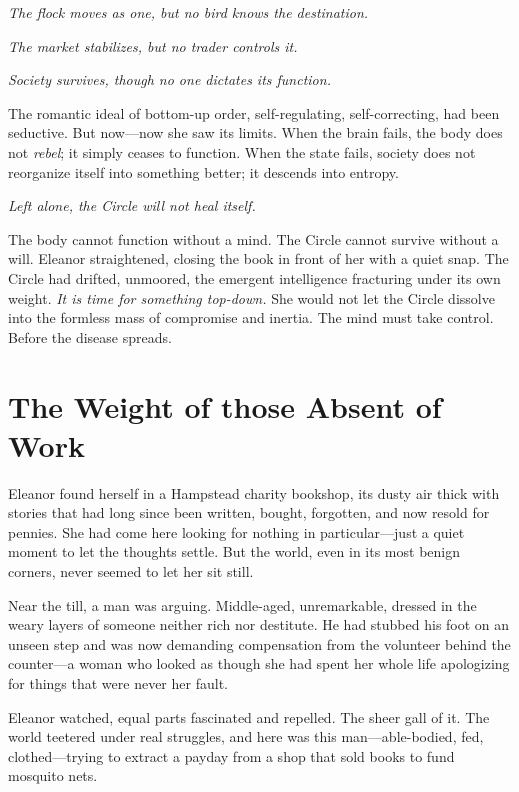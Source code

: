 \smallskip

\textit{The flock moves as one, but no bird knows the destination.}

\textit{The market stabilizes, but no trader controls it.}  

\textit{Society survives, though no one dictates its function.}  

\smallskip

The romantic ideal of bottom-up order, self-regulating, self-correcting, had been seductive. But now—now she saw its limits. When the brain fails, the body does not \textit{rebel}; it simply ceases to function.  When the state fails, society does not reorganize itself into something better; it descends into entropy.  

\smallskip

\textit{Left alone, the Circle will not heal itself.}  

\smallskip

The body cannot function without a mind. The Circle cannot survive without a will. Eleanor straightened, closing the book in front of her with a quiet snap.  The Circle had drifted, unmoored, the emergent intelligence fracturing under its own weight.  \textit{It is time for something top-down.}  She would not let the Circle dissolve into the formless mass of compromise and inertia.  The mind must take control.  Before the disease spreads.  

\newpage
\section*{The Weight of those Absent of Work}

Eleanor found herself in a Hampstead charity bookshop, its dusty air thick with stories that had long since been written, bought, forgotten, and now resold for pennies. She had come here looking for nothing in particular—just a quiet moment to let the thoughts settle. But the world, even in its most benign corners, never seemed to let her sit still.

Near the till, a man was arguing. Middle-aged, unremarkable, dressed in the weary layers of someone neither rich nor destitute. He had stubbed his foot on an unseen step and was now demanding compensation from the volunteer behind the counter—a woman who looked as though she had spent her whole life apologizing for things that were never her fault.

Eleanor watched, equal parts fascinated and repelled. The sheer gall of it. The world teetered under real struggles, and here was this man—able-bodied, fed, clothed—trying to extract a payday from a shop that sold books to fund mosquito nets.

